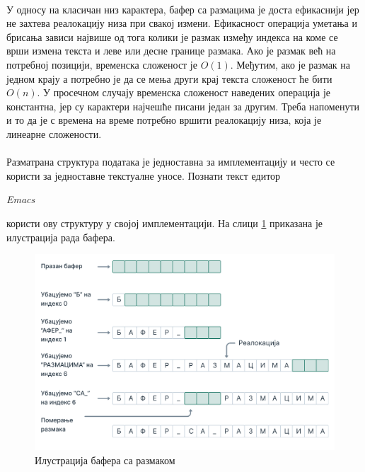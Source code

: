 \documentclass[12pt,oneside]{memoir}
\begin{document}
\paragraph{}
У односу на класичан низ карактера, бафер са размацима је доста 
ефикаснији јер не захтева реалокацију низа при свакој измени. Ефикасност операција уметања и 
брисања зависи највише од тога колики је размак између индекса на коме се  
врши измена текста и леве или десне границе размака. Ако је размак већ на потребној позицији, 
временска сложеност је \(O(1)\). Међутим, ако је размак на једном крају а потребно је да 
се мења други крај текста сложеност ће бити \(O(n)\). У просечном случају временска 
сложеност наведених операција је константна, јер су карактери најчешће писани један за другим. 
Треба напоменути и то да је с времена на време потребно вршити реалокацију низа, 
која је линеарне сложености.

\paragraph{}
Разматрана структура података је једноставна за имплементацију и често се користи за једноставне
текстуалне уносе. Познати текст едитор \begin{latinica}\textit{Emacs}\end{latinica} \cite{Emacs} 
користи ову структуру у својој имплементацији. На слици \ref{fig:gap_buffer} приказана је 
илустрација рада бафера.

\begin{figure}[!ht]
  \centering
  \includegraphics[width=1.1\textwidth]{images/Bafer_3.png}
  \caption{Илустрација бафера са размаком}
  \label{fig:gap_buffer}
\end{figure}
\end{document}
